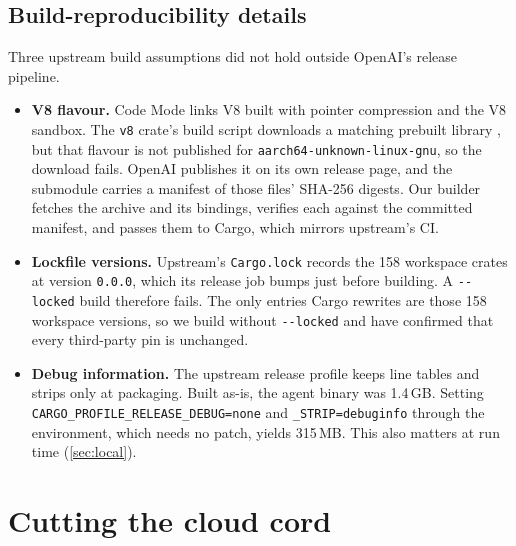 \documentclass[11pt]{article}
\newcommand{\code}[1]{\texttt{#1}}
\begin{document}
\subsection{Build-reproducibility details}

Three upstream build assumptions did not hold outside OpenAI's release pipeline.
\begin{itemize}
  \item \textbf{V8 flavour.} Code Mode links V8 built with pointer compression and the V8 sandbox.
    The \code{v8} crate's build script downloads a matching prebuilt library \cite{rustyv8}, but that
    flavour is not published for \code{aarch64-unknown-linux-gnu}, so the download fails. OpenAI
    publishes it on its own release page, and the submodule carries a manifest of those files'
    SHA-256 digests. Our builder fetches the archive and its bindings, verifies each against the
    committed manifest, and passes them to Cargo, which mirrors upstream's CI.
  \item \textbf{Lockfile versions.} Upstream's \code{Cargo.lock} records the 158 workspace crates at
    version \code{0.0.0}, which its release job bumps just before building. A \code{-{}-locked} build
    therefore fails. The only entries Cargo rewrites are those 158 workspace versions, so we build
    without \code{-{}-locked} and have confirmed that every third-party pin is unchanged.
  \item \textbf{Debug information.} The upstream release profile keeps line tables and strips only
    at packaging. Built as-is, the agent binary was 1.4\,GB. Setting
    \code{CARGO\_PROFILE\_RELEASE\_DEBUG=none} and \code{\_STRIP=debuginfo} through the environment,
    which needs no patch, yields 315\,MB. This also matters at run time
    (\cref{sec:local}).
\end{itemize}

\section{Cutting the cloud cord}
\label{sec:cloud}
\end{document}
